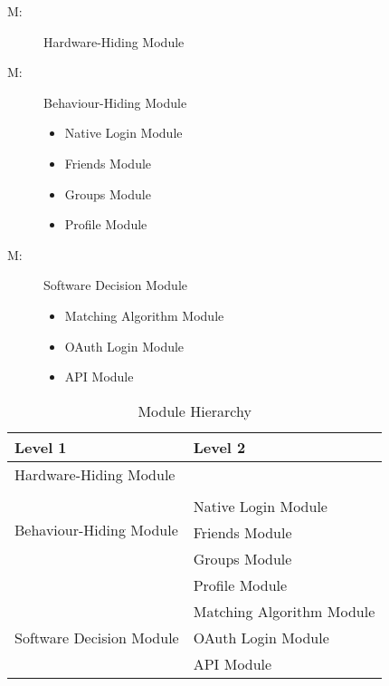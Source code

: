\documentclass[12pt, titlepage]{article}
\newcounter{mnum}
\newcommand{\mthemnum}{M\themnum}
\begin{document}
\begin{description}
\item [ \mthemnum \label{mHH}:] Hardware-Hiding Module
\item [ \mthemnum \label{mBH}:] Behaviour-Hiding Module
	\begin{itemize}
		\item [\refstepcounter{mnum} \mthemnum \label{mNL}:] Native Login Module
		\item [\refstepcounter{mnum} \mthemnum \label{mF}:] Friends Module
		\item [\refstepcounter{mnum} \mthemnum \label{mG}:] Groups Module
		\item [\refstepcounter{mnum} \mthemnum \label{mPM}:] Profile Module
	\end{itemize}
\item [ \mthemnum \label{mSD}:] Software Decision Module
	\begin{itemize}
		\item [\refstepcounter{mnum} \mthemnum \label{mMA}:] Matching Algorithm Module
		\item [\refstepcounter{mnum} \mthemnum \label{mOL}:] OAuth Login Module
		\item [\refstepcounter{mnum} \mthemnum \label{mA}:] API Module
	\end{itemize}
\end{description}


\begin{table}[h!]
\centering
\begin{tabular}{p{} p{}}
\toprule
\textbf{Level 1} & \textbf{Level 2}\\
\midrule

{Hardware-Hiding Module} & ~ \\
\midrule

\multirow{4}{0.3\textwidth}{Behaviour-Hiding Module} & \\
& Native Login Module\\
& Friends Module\\
& Groups Module\\
& Profile Module\\
\midrule

\multirow{3}{0.3\textwidth}{Software Decision Module} & {Matching Algorithm Module}\\
& OAuth Login Module\\
& API Module\\
\bottomrule

\end{tabular}
\caption{Module Hierarchy}
\label{TblMH}
\end{table}
\end{document}
